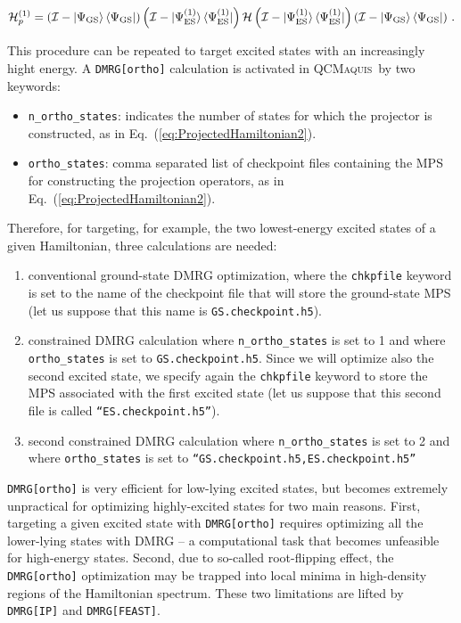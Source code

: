 \documentclass[bibliography=totoc,12pt,a4paper]{scrartcl}
\newcommand{\qcm}{\textsc{QCMaquis}}
\begin{document}
\begin{equation}
  \mathcal{H}_p^{(1)} = \left( \mathcal{I} - \ket{\Psi_\text{GS}} \bra{\Psi_\text{GS}} \right)
						\left( \mathcal{I} - \ket{\Psi_\text{ES}^{(1)}} \bra{\Psi_\text{ES}^{(1)}} \right)
  				  		\mathcal{H}
						\left( \mathcal{I} - \ket{\Psi_\text{ES}^{(1)}} \bra{\Psi_\text{ES}^{(1)}} \right)
				  		\left( \mathcal{I} - \ket{\Psi_\text{GS}} \bra{\Psi_\text{GS}} \right) \, .
  \label{eq:ProjectedHamiltonian2}
\end{equation}

\noindent This procedure can be repeated to target excited states with an increasingly hight energy.
A \texttt{DMRG[ortho]} calculation is activated in \qcm\ by two keywords:

\begin{itemize}
  \item \texttt{n\_ortho\_states}: indicates the number of states for which the projector is constructed, as in Eq.~(\ref{eq:ProjectedHamiltonian2}).
  \item \texttt{ortho\_states}: comma separated list of checkpoint files containing the MPS for constructing the projection operators, as in Eq.~(\ref{eq:ProjectedHamiltonian2}).
\end{itemize}
%
Therefore, for targeting, for example, the two lowest-energy excited states of a given Hamiltonian, three calculations are needed:

\begin{enumerate}
  \item conventional ground-state DMRG optimization, where the \texttt{chkpfile} keyword is set to the name of the checkpoint file that will store the ground-state MPS (let us suppose that this name is \texttt{GS.checkpoint.h5}).
  \item constrained DMRG calculation where \texttt{n\_ortho\_states} is set to 1 and where \texttt{ortho\_states} is set to \texttt{GS.checkpoint.h5}.
  Since we will optimize also the second excited state, we specify again the \texttt{chkpfile} keyword to store the MPS associated with the first excited state (let us suppose that this second file is called \texttt{``ES.checkpoint.h5''}).
  \item second constrained DMRG calculation where \texttt{n\_ortho\_states} is set to 2 and where \texttt{ortho\_states} is set to \texttt{``GS.checkpoint.h5,ES.checkpoint.h5''}
\end{enumerate}

\noindent \texttt{DMRG[ortho]} is very efficient for low-lying excited states, but becomes extremely unpractical for optimizing highly-excited states for two main reasons.
First, targeting a given excited state with \texttt{DMRG[ortho]} requires optimizing all the lower-lying states with DMRG -- a computational task that becomes unfeasible for high-energy states.
Second, due to so-called root-flipping effect, the \texttt{DMRG[ortho]} optimization may be trapped into local minima in high-density regions of the Hamiltonian spectrum.
These two limitations are lifted by \texttt{DMRG[IP]} and \texttt{DMRG[FEAST]}.
\end{document}
